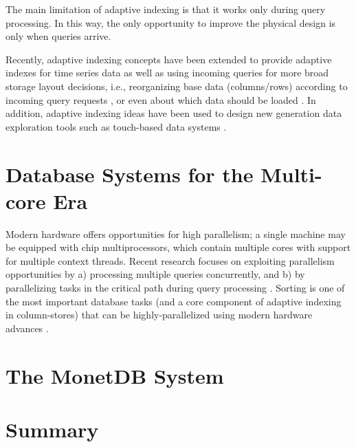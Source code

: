 The main limitation of adaptive indexing is that it works only during query processing.
In this way, the only opportunity to improve the physical design is only when queries arrive.

Recently, adaptive indexing concepts have been extended to provide adaptive indexes for time series data \cite{DBLP:conf/sigmod/ZoumpatianosIP14}
as well as using incoming queries for more broad storage layout decisions, 
i.e., reorganizing base data (columns/rows) according to incoming query requests \cite{Alagiannis:2014:HHA:2588555.2610502}, 
or even about which data should be loaded \cite{DBLP:conf/cidr/IdreosAJA11}.
In addition, adaptive indexing ideas have been used to design new generation data exploration tools such as 
touch-based data systems \cite{DBLP:conf/cidr/IdreosL13, DBLP:conf/icde/LiarouI14}.


\section{Database Systems for the Multi-core Era}
\label{sec:multicore_systems}

Modern hardware offers opportunities for high parallelism;
a single machine may be equipped with chip multiprocessors, which contain multiple cores with support for multiple context threads.
Recent research focuses on exploiting parallelism opportunities by a) processing multiple queries concurrently, 
and b) by 
parallelizing 
tasks in the critical path during query processing
\cite{mc1,DBLP:conf/cidr/HarizopoulosA03,DBLP:conf/sigmod/HarizopoulosSA05,mc2}.
Sorting is one of the most important database tasks (and a core component of adaptive indexing in column-stores) that can be highly-parallelized using modern hardware advances \cite{hash_join_rev, hash_sort_SIMD, Polychroniou:2014:CSM:2588555.2610522, database_SIMD}.



\section{The MonetDB System}
\label{sec:monetdb}



\section{Summary}
\label{sec:summaryRelated}

